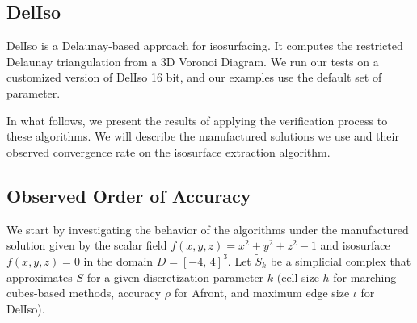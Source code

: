 \subsection{DelIso} DelIso \cite{Dey07} is a Delaunay-based 
approach for isosurfacing. It computes the restricted Delaunay triangulation 
from a 3D Voronoi Diagram. We run our tests on a customized version of DelIso 16 bit, 
and our examples use the default set of parameter.

In what follows, we present the results of applying the verification process 
to these algorithms. We will describe the manufactured solutions we use and
their observed convergence rate on the isosurface extraction algorithm.



\subsection{Observed Order of Accuracy}
\label{chap1:sec:verification-results}

We start by investigating the behavior of the algorithms 
under the manufactured solution given by the
scalar field $f(x,y,z) = x^2+y^2+z^2 - 1$ and isosurface $f(x,y,z) =
0$ in the domain $D=[-4,\, 4]^3$.
Let $\tilde{S}_k$ be a simplicial complex that approximates $S$ for a given 
discretization parameter $k$ (cell size $h$ for marching cubes-based methods, 
accuracy $\rho$ for Afront, and maximum edge size $\iota$ for DelIso).

